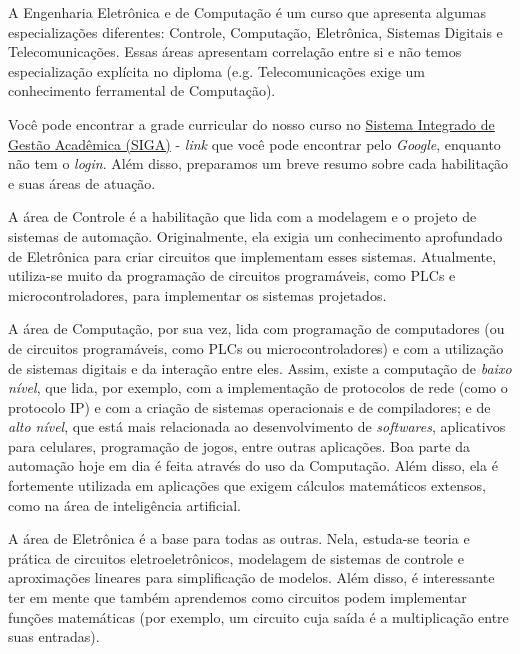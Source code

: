     	A Engenharia Eletrônica e de Computação é um curso que apresenta algumas especializações diferentes: Controle, Computação, Eletrônica, Sistemas Digitais e Telecomunicações. Essas áreas apresentam correlação entre si e não temos especialização explícita no diploma (e.g. Telecomunicações exige um conhecimento ferramental de Computação). 
    	
    	Você pode encontrar a grade curricular do nosso curso no \href{https://siga.ufrj.br/sira/temas/zire/frameConsultas.jsp?mainPage=/repositorio-curriculo/ACE1A6AC-92A4-F79D-3494-03B00781F450.html}{Sistema Integrado de Gestão Acadêmica (SIGA)} - \textit{link} que você pode encontrar pelo \textit{Google}, enquanto não tem o \textit{login}. Além disso, preparamos um breve resumo sobre cada habilitação e suas áreas de atuação.
        
        	A área de Controle é a habilitação que lida com a modelagem e o projeto de sistemas de automação. Originalmente, ela exigia um conhecimento aprofundado de Eletrônica para criar circuitos que implementam esses sistemas. Atualmente, utiliza-se muito da programação de circuitos programáveis, como PLCs e microcontroladores, para implementar os sistemas projetados.
            
        	A área de Computação, por sua vez, lida com programação de computadores (ou de circuitos programáveis, como PLCs ou microcontroladores) e com a utilização de sistemas digitais e da interação entre eles. Assim, existe a computação de \textit{baixo nível}, que lida, por exemplo, com a implementação de protocolos de rede (como o protocolo IP) e com a criação de sistemas operacionais e de compiladores; e de \textit{alto nível}, que está mais relacionada ao desenvolvimento de \textit{softwares}, aplicativos para celulares, programação de jogos, entre outras aplicações. Boa parte da automação hoje em dia é feita através do uso da Computação. Além disso, ela é fortemente utilizada em aplicações que exigem cálculos matemáticos extensos, como na área de inteligência artificial.
            
        	A área de Eletrônica é a base para todas as outras. Nela, estuda-se teoria e prática de circuitos eletroeletrônicos, modelagem de sistemas de controle e aproximações lineares para simplificação de modelos. Além disso, é interessante ter em mente que também aprendemos como circuitos podem implementar funções matemáticas (por exemplo, um circuito cuja saída é a multiplicação entre suas entradas). 
            
